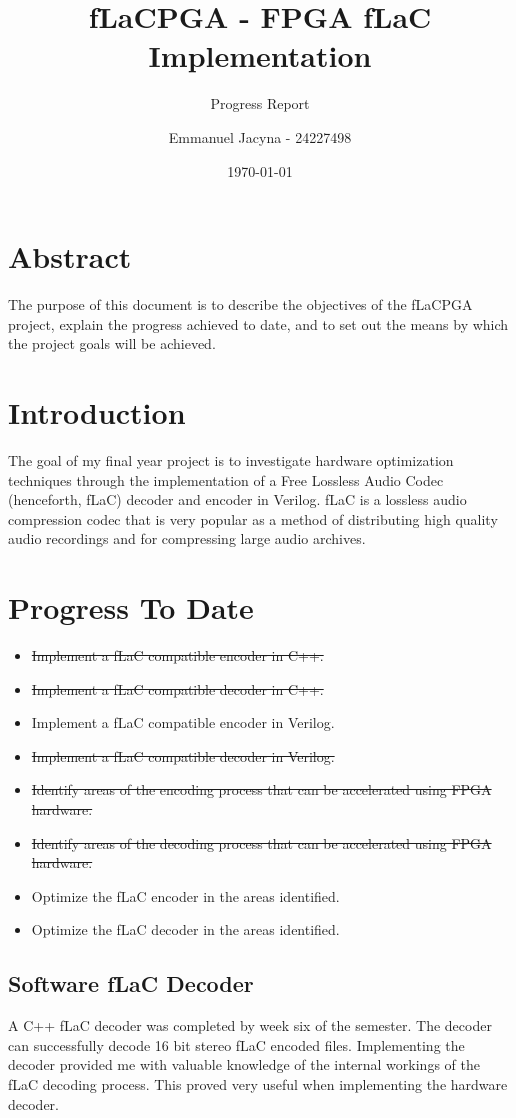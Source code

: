 \documentclass[12pt]{scrartcl}
\title{fLaCPGA - FPGA fLaC Implementation}
\subtitle{Progress Report}
\author{Emmanuel Jacyna - 24227498}
\date{\today}
\begin{document}
\pagestyle{myheadings}
  \maketitle
  \tableofcontents
  
  \section*{Abstract}
  The purpose of this document is to describe the objectives of the fLaCPGA project, explain the progress achieved to date, and to set out the means by which the project goals will be achieved.
  \section{Introduction}
  The goal of my final year project is to investigate hardware optimization techniques through the implementation of a Free Lossless Audio Codec (henceforth, fLaC) decoder and encoder in Verilog. fLaC is a lossless audio compression codec that is very popular as a method of distributing high quality audio recordings and for compressing large audio archives\cite{flac_popular}.
  
  \section{Progress To Date}
  \begin{itemize}
    \item \st{Implement a fLaC compatible encoder in C++.}
    \item \st{Implement a fLaC compatible decoder in C++.}
    \item Implement a fLaC compatible encoder in Verilog.
    \item \st{Implement a fLaC compatible decoder in Verilog.}
    \item \st{Identify areas of the encoding process that can be accelerated using FPGA hardware.}
    \item \st{Identify areas of the decoding process that can be accelerated using FPGA hardware.}
    \item Optimize the fLaC encoder in the areas identified.
    \item Optimize the fLaC decoder in the areas identified.
  \end{itemize}
  
  \subsection{Software fLaC Decoder}
  A C++ fLaC decoder was completed by week six of the semester. The decoder can successfully decode 16 bit stereo fLaC encoded files. Implementing the decoder provided me with valuable knowledge of the internal workings of the fLaC decoding process. This proved very useful when implementing the hardware decoder. \\
  
\end{document}
